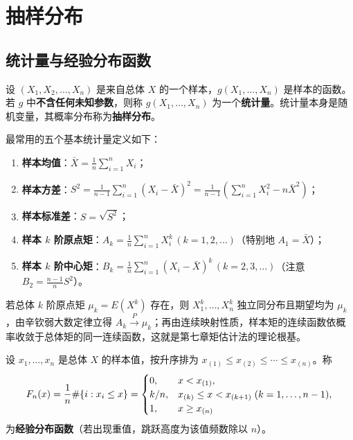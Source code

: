 \section{抽样分布}
\label{sec:sampling-distribution}

\subsection{统计量与经验分布函数}

\begin{definition}[统计量]
\label{def:statistic}
设 $(X_1,X_2,\ldots,X_n)$ 是来自总体 $X$ 的一个样本，$g(X_1,\ldots,X_n)$ 是样本的函数。若 $g$ 中\textbf{不含任何未知参数}，则称 $g(X_1,\ldots,X_n)$ 为一个\textbf{统计量}。统计量本身是随机变量，其概率分布称为\textbf{抽样分布}。
\end{definition}

最常用的五个基本统计量定义如下：
\begin{enumerate}
  \item \textbf{样本均值}：$\displaystyle\bar{X}=\frac{1}{n}\sum_{i=1}^{n}X_i$；
  \item \textbf{样本方差}：$\displaystyle S^2=\frac{1}{n-1}\sum_{i=1}^{n}(X_i-\bar{X})^2=\frac{1}{n-1}\left(\sum_{i=1}^{n}X_i^2-n\bar{X}^2\right)$；
  \item \textbf{样本标准差}：$S=\sqrt{S^2}$；
  \item \textbf{样本 $k$ 阶原点矩}：$\displaystyle A_k=\frac{1}{n}\sum_{i=1}^{n}X_i^k\,(k=1,2,\ldots)$（特别地 $A_1=\bar{X}$）；
  \item \textbf{样本 $k$ 阶中心矩}：$\displaystyle B_k=\frac{1}{n}\sum_{i=1}^{n}(X_i-\bar{X})^k\,(k=2,3,\ldots)$（注意 $B_2=\frac{n-1}{n}S^2$）。
\end{enumerate}

若总体 $k$ 阶原点矩 $\mu_k=E(X^k)$ 存在，则 $X_1^k,\ldots,X_n^k$ 独立同分布且期望均为 $\mu_k$，由辛钦弱大数定律立得 $A_k\xrightarrow{P}\mu_k$；再由连续映射性质，样本矩的连续函数依概率收敛于总体矩的同一连续函数，这就是第七章矩估计法的理论根基。

\begin{definition}[经验分布函数]
\label{def:empirical-cdf}
设 $x_1,\ldots,x_n$ 是总体 $X$ 的样本值，按升序排为 $x_{(1)}\le x_{(2)}\le\cdots\le x_{(n)}$。称
\begin{equation}
  F_n(x)=\frac{1}{n}\#\{i: x_i\le x\}=
  \begin{cases}
    0,& x<x_{(1)},\\
    k/n,& x_{(k)}\le x<x_{(k+1)}\;(k=1,\ldots,n-1),\\
    1,& x\ge x_{(n)}
  \end{cases}
  \label{eq:empirical-cdf}
\end{equation}
为\textbf{经验分布函数}（若出现重值，跳跃高度为该值频数除以 $n$）。
\end{definition}

